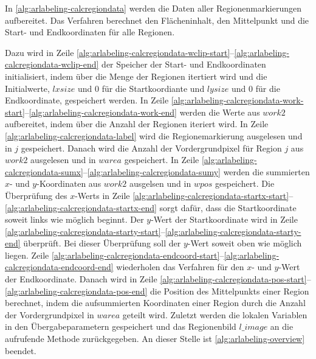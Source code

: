 

In \autoref{alg:arlabeling-calcregiondata} werden die Daten aller Regionenmarkierungen aufbereitet. Das Verfahren
 berechnet den Flächeninhalt, den Mittelpunkt und die Start- und Endkoordinaten für alle Regionen.



Dazu wird in Zeile \ref{alg:arlabeling-calcregiondata-wclip-start}--\ref{alg:arlabeling-calcregiondata-wclip-end} der
 Speicher der Start- und Endkoordinaten initialisiert, indem über die Menge der Regionen itertiert wird und die
 Initialwerte, $\mathit{lxsize}$ und $0$ für die Startkoordiante und $\mathit{lysize}$ und $0$ für die Endkoordinate,
 gespeichert werden. In Zeile
 \ref{alg:arlabeling-calcregiondata-work-start}--\ref{alg:arlabeling-calcregiondata-work-end} werden die Werte aus
 $\mathit{work2}$ aufbereitet, indem über die Anzahl der Regionen iteriert wird. In Zeile
 \ref{alg:arlabeling-calcregiondata-label} wird die Regionemarkierung ausgelesen und in $j$ gespeichert. Danach wird
 die Anzahl der Vordergrundpixel für Region $j$ aus $\mathit{work2}$ ausgelesen und in $\mathit{warea}$ gespeichert. In
 Zeile \ref{alg:arlabeling-calcregiondata-sumx}--\ref{alg:arlabeling-calcregiondata-sumy} werden die summierten $x$- und
 $y$-Koordinaten aus $\mathit{work2}$ ausgelsen und in $\mathit{wpos}$ gespeichert. Die Überprüfung des $x$-Werts in
 Zeile \ref{alg:arlabeling-calcregiondata-startx-start}--\ref{alg:arlabeling-calcregiondata-startx-end} sorgt dafür,
 dass die Startkoordinate soweit links wie möglich beginnt. Der $y$-Wert der Startkoordinate wird in Zeile
 \ref{alg:arlabeling-calcregiondata-starty-start}--\ref{alg:arlabeling-calcregiondata-starty-end} überprüft. Bei dieser
 Überprüfung soll der $y$-Wert soweit oben wie möglich liegen. Zeile
 \ref{alg:arlabeling-calcregiondata-endcoord-start}--\ref{alg:arlabeling-calcregiondata-endcoord-end} wiederholen das
 Verfahren für den $x$- und $y$-Wert der Endkoordinate. Danach wird in Zeile
 \ref{alg:arlabeling-calcregiondata-pos-start}--\ref{alg:arlabeling-calcregiondata-pos-end} die Position
 des Mittelpunkts einer Region berechnet, indem die aufsummierten Koordinaten einer Region durch die Anzahl der
 Vordergrundpixel in $\mathit{warea}$ geteilt wird. Zuletzt werden die lokalen Variablen in den Übergabeparametern
 gespeichert und das Regionenbild $\mathit{l\_image}$ an die aufrufende Methode zurückgegeben. An dieser Stelle ist
 \autoref{alg:arlabeling-overview} beendet.

